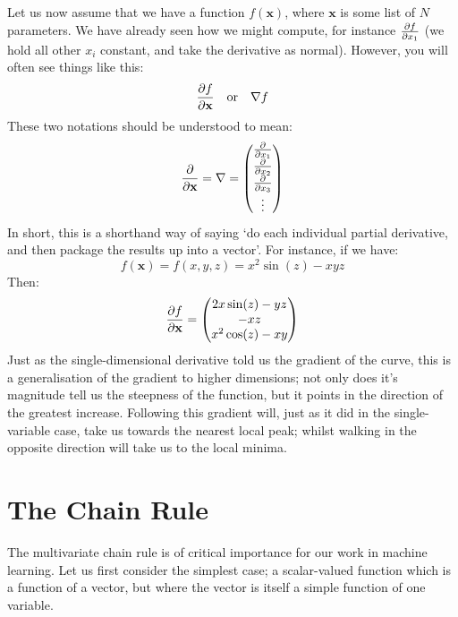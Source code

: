 \documentclass[a4paper,openany,11pt]{book}
\renewcommand\vec[1]{\boldsymbol{\mathbf{#1}}}
\begin{document}
			Let us now assume that we have a function $f(\vec{x})$, where $\vec{x}$ is some list of $N$ parameters. We have already seen how we might compute, for instance $\frac{\partial f}{\partial x_1}$ (we hold all other $x_i$ constant, and take the derivative as normal). However, you will often see things like this:
			\begin{equation}
				\pdiv{f}{\vec{x}} ~~~\text{or}~~~ \nabla f
			\end{equation}
			These two notations should be understood to mean:
			\begin{equation}
				\pdiv{}{\vec{x}} = \nabla = \begin{pmatrix} \pdiv{}{x_1} \\ \pdiv{}{x_2} \\ \pdiv{}{x_3} \\ \vdots \end{pmatrix}
			\end{equation}
			In short, this is a shorthand way of saying `do each individual partial derivative, and then package the results up into a vector'. For instance, if we have:
			\begin{equation}
				f(\vec{x}) = f(x,y,z) = x^2 \sin(z) - xyz 
			\end{equation}
			Then:
			\begin{equation}
				\pdiv{f}{\vec{x}} = \begin{pmatrix} 2x \sin(z) - yz \\ -xz \\ x^2 \cos(z) - xy \end{pmatrix}
			\end{equation}
			Just as the single-dimensional derivative told us the gradient of the curve, this is a generalisation of the gradient to higher dimensions; not only does it's magnitude tell us the steepness of the function, but it points in the direction of the greatest increase. Following this gradient will, just as it did in the single-variable case, take us towards the nearest local peak; whilst walking in the opposite direction will take us to the local minima.
		
		\section{The Chain Rule}

			The multivariate chain rule is of critical importance for our work in machine learning. Let us first consider the simplest case; a scalar-valued function which is a function of a vector, but where the vector is itself a simple function of one variable. 
\end{document}
